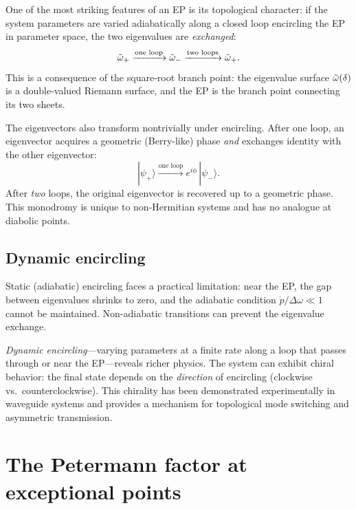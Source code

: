 One of the most striking features of an EP is its topological character:
if the system parameters are varied adiabatically along a closed loop
encircling the EP in parameter space, the two eigenvalues are
\emph{exchanged}:
\begin{equation}
 \tilde{\omega}_+ \xrightarrow{\text{one loop}} \tilde{\omega}_-
 \xrightarrow{\text{two loops}} \tilde{\omega}_+.
 \label{eq:eigenvalue-exchange}
\end{equation}
This is a consequence of the square-root branch point: the eigenvalue
surface $\tilde{\omega}(\delta)$ is a double-valued Riemann surface, and the EP
is the branch point connecting its two sheets.

The eigenvectors also transform nontrivially under encircling. After one
loop, an eigenvector acquires a geometric (Berry-like) phase \emph{and}
exchanges identity with the other eigenvector:
\begin{equation}
 |\psi_+\rangle \xrightarrow{\text{one loop}} e^{i\phi}\,|\psi_-\rangle.
 \label{eq:evec-exchange}
\end{equation}
After \emph{two} loops, the original eigenvector is recovered up to a
geometric phase. This monodromy is unique to non-Hermitian systems and
has no analogue at diabolic points.

\subsection{Dynamic encircling}
\label{ssec:dynamic-encircling}

Static (adiabatic) encircling faces a practical limitation: near the EP,
the gap between eigenvalues shrinks to zero, and the adiabatic condition
$\dot{p}/\Delta\omega \ll 1$ cannot be maintained. Non-adiabatic
transitions can prevent the eigenvalue exchange.

\emph{Dynamic encircling}---varying parameters at a finite rate along a
loop that passes through or near the EP---reveals richer physics. The
system can exhibit chiral behavior: the final state depends on the
\emph{direction} of encircling (clockwise vs.\ counterclockwise). This
chirality has been demonstrated experimentally in waveguide systems and
provides a mechanism for topological mode switching and asymmetric
transmission.


\section{The Petermann factor at exceptional points}
\label{sec:petermann-ep}

